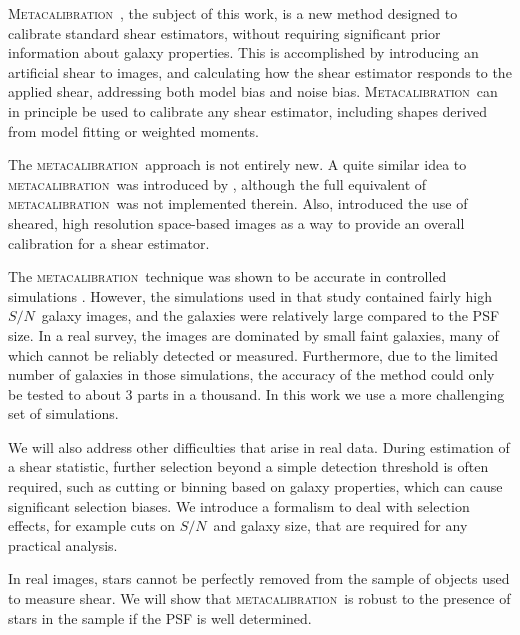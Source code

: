 \documentclass[iop]{emulateapj}
\newcommand{\snr}{$S/N$}
\newcommand{\mcal}{\textsc{metacalibration}}
\newcommand{\Mcal}{\textsc{Metacalibration}}
\begin{document}
\Mcal\ \citep{HuffMcal}, the subject of this work, is a new method designed to
calibrate standard shear estimators, without requiring significant prior
information about galaxy properties.  This is accomplished by introducing an
artificial shear to images, and calculating how the shear estimator responds to
the applied shear, addressing both model bias and noise bias.  \Mcal\ can in
principle be used to calibrate any shear estimator, including shapes derived
from model fitting or weighted moments.

The \mcal\ approach is not entirely new. A quite similar idea to \mcal\ was
introduced by \cite{Kaiser2000}, although the full equivalent of \mcal\ was not
implemented therein.  Also, \cite{ksb95} introduced the use of sheared, high
resolution space-based images as a way to provide an overall calibration for a
shear estimator.



The \mcal\ technique was shown to be accurate in controlled simulations
\citep{HuffMcal}.  However, the simulations used in that study \citep[based on
those used in][]{great3} contained fairly high \snr\ galaxy images, and the
galaxies were relatively large compared to the PSF size.  In a real survey, the
images are dominated by small faint galaxies, many of which cannot be reliably
detected or measured.  Furthermore, due to the limited number of galaxies in
those simulations, the accuracy of the method could only be tested to about 3
parts in a thousand.  In this work we use a more challenging set of
simulations.

We will also address other difficulties that arise in real data.  During
estimation of a shear statistic, further selection beyond a simple detection
threshold is often required, such as cutting or binning based on galaxy
properties, which can cause significant selection biases.  We introduce a
formalism to deal with selection effects, for example cuts on \snr\ and galaxy
size, that are required for any practical analysis. 

In real images, stars cannot be perfectly removed from the sample of objects
used to measure shear. We will show that \mcal\ is robust to the presence of
stars in the sample if the PSF is well determined.
\end{document}
